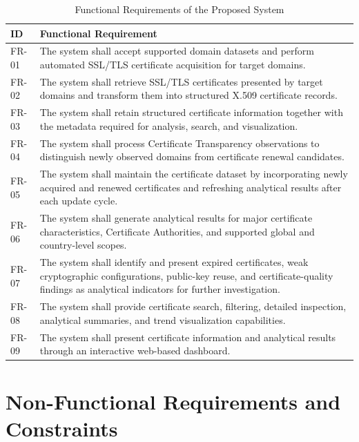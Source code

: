 \begin{table}[htbp]
  \centering
  \small
  \setlength{\tabcolsep}{4pt}
  \renewcommand{\arraystretch}{1.08}
  \caption{Functional Requirements of the Proposed System}
  \label{tab:derived-functional-requirements}
  \begin{tabularx}{\textwidth}{@{}>{\Centering\arraybackslash}p{}Y@{}}
    \toprule
    \textbf{ID} & \textbf{Functional Requirement} \\
    \midrule
    FR-01 & The system shall accept supported domain datasets and perform automated SSL/TLS certificate acquisition for target domains. \\
    FR-02 & The system shall retrieve SSL/TLS certificates presented by target domains and transform them into structured X.509 certificate records. \\
    FR-03 & The system shall retain structured certificate information together with the metadata required for analysis, search, and visualization. \\
    FR-04 & The system shall process Certificate Transparency observations to distinguish newly observed domains from certificate renewal candidates. \\
    FR-05 & The system shall maintain the certificate dataset by incorporating newly acquired and renewed certificates and refreshing analytical results after each update cycle. \\
    FR-06 & The system shall generate analytical results for major certificate characteristics, Certificate Authorities, and supported global and country-level scopes. \\
    FR-07 & The system shall identify and present expired certificates, weak cryptographic configurations, public-key reuse, and certificate-quality findings as analytical indicators for further investigation. \\
    FR-08 & The system shall provide certificate search, filtering, detailed inspection, analytical summaries, and trend visualization capabilities. \\
    FR-09 & The system shall present certificate information and analytical results through an interactive web-based dashboard. \\
    \bottomrule
  \end{tabularx}
\end{table}


\section{Non-Functional Requirements and Constraints}
\label{sec:derived-quality-attributes}

